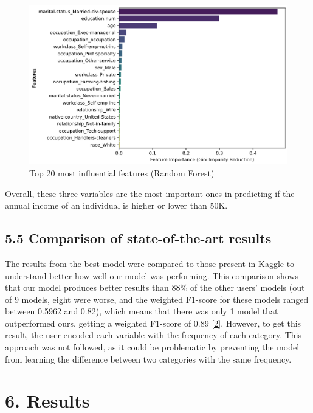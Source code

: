 \documentclass[a4paper,oneside,bibliography=totoc]{scrbook}
\begin{document}
\begin{figure}[H]
	\centering
	\includegraphics[width=0.6\linewidth]{screenshot023}
	\caption{Top 20 most influential features (Random Forest)}
	\label{fig:screenshot023}
\end{figure}

Overall, these three variables are the most important ones in predicting if the annual income of an individual is higher or lower than 50K.

\subsection*{5.5 Comparison of state-of-the-art results}

The results from the best model were compared to those present in Kaggle to understand better how well our model was performing. This comparison shows that our model produces better results than 88\% of the other users’ models (out of 9 models, eight were worse, and the weighted F1-score for these models ranged between 0.5962 and 0.82), which means that there was only 1 model that outperformed ours, getting a weighted F1-score of 0.89 \href{https://www.kaggle.com/code/thotasivateja57/accuracy-approximately-90-percent}{[2]}.  However, to get this result, the user encoded each variable with the frequency of each category. This approach was not followed, as it could be problematic by preventing the model from learning the difference between two categories with the same frequency.  


\section*{6. Results}
\end{document}
